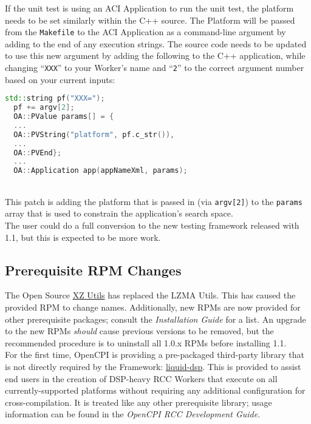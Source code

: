 If the unit test is using an ACI Application to run the unit test, the platform needs to be set similarly within the C++ source. The Platform will be passed from the \texttt{Makefile} to the ACI Application as a command-line argument by adding  to the end of any execution strings. The source code needs to be updated to use this new argument by adding the following to the C++ application, while changing ``\texttt{XXX}'' to your Worker's name and ``\texttt{2}'' to the correct argument number based on your current inputs:\\
\begin{minipage}{\linewidth}
\begin{lstlisting}[language=c++]
  std::string pf("XXX=");
  pf += argv[2];
  OA::PValue params[] = {
  ...
  OA::PVString("platform", pf.c_str()),
  ...
  OA::PVEnd};
  ...
  OA::Application app(appNameXml, params);
\end{lstlisting}
\end{minipage}
~\\
This patch is adding the platform that is passed in (via \texttt{argv[2]}) to the \texttt{params} array that is used to constrain the application's search space.\\

The user could do a full conversion to the new testing framework released with 1.1, but this is expected to be more work.

\subsection{Prerequisite RPM Changes}
\label{sec:11_prereq}
The Open Source \href{http://tukaani.org/xz/}{XZ Utils} has replaced the LZMA Utils. This has caused the provided RPM to change names. Additionally, new RPMs are now provided for other prerequisite packages; consult the \textit{Installation Guide} for a list. An upgrade to the new RPMs \textit{should} cause previous versions to be removed, but the recommended procedure is to uninstall all 1.0.x RPMs before installing 1.1.\\

For the first time, OpenCPI is providing a pre-packaged third-party library that is not directly required by the Framework: \href{http://liquidsdr.org/}{liquid-dsp}. This is provided to assist end users in the creation of DSP-heavy RCC Workers that execute on all currently-supported platforms without requiring any additional configuration for cross-compilation. It is treated like any other prerequisite library; usage information can be found in the \textit{OpenCPI RCC Development Guide}.

